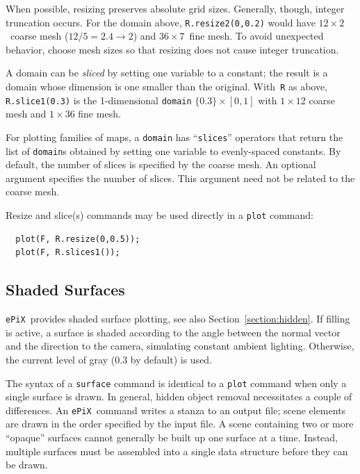 \documentclass[12pt]{report}
\newcommand{\code}[1]{\texttt{#1}}
\newcommand{\ePiX}{\code{ePiX}}
\begin{document}
When possible, resizing preserves absolute grid sizes. Generally,
though, integer truncation occurs.  For the domain above,
\code{R.resize2(0,0.2)} would have $12\times2$~coarse mesh
($12/5=2.4\to2$) and $36\times7$~fine mesh.  To avoid unexpected
behavior, choose mesh sizes so that resizing does not cause integer
truncation.


A domain can be \emph{sliced} by setting one variable to a constant;
the result is a domain whose dimension is one smaller than the
original. With~\code{R} as above, \code{R.slice1(0.3)} is the
1-dimensional \code{domain} $\{0.3\}\times[0,1]$ with $1\times12$
coarse mesh and $1\times36$ fine mesh.

For plotting families of maps, a \code{domain} has ``\code{slices}''
operators that return the list of \code{domain}s obtained by setting
one variable to evenly-spaced constants.  By default, the number of
slices is specified by the coarse mesh. An optional argument specifies
the number of slices. This argument need not be related to the coarse
mesh.
\begin{center}
  
\end{center}
\smallskip
Resize and slice(s) commands may be used directly in a \code{plot}
command:
\begin{verbatim}
  plot(F, R.resize(0,0.5));
  plot(F, R.slices1());
\end{verbatim}



\subsection*{Shaded Surfaces}

\ePiX\ provides shaded surface plotting, see also
Section~\ref{section:hidden}.  If filling is active, a surface is
shaded according to the angle between the normal vector and the
direction to the camera, simulating constant ambient lighting.
Otherwise, the current level of gray ($0.3$ by default) is used.

The syntax of a \code{surface} command is identical to a \code{plot}
command when only a single surface is drawn. In general, hidden object
removal necessitates a couple of differences. An \ePiX\ command writes
a stanza to an output file; scene elements are drawn in the order
specified by the input file. A scene containing two or more ``opaque''
surfaces cannot generally be built up one surface at a time. Instead,
multiple surfaces must be assembled into a single data structure
before they can be drawn.
\end{document}
